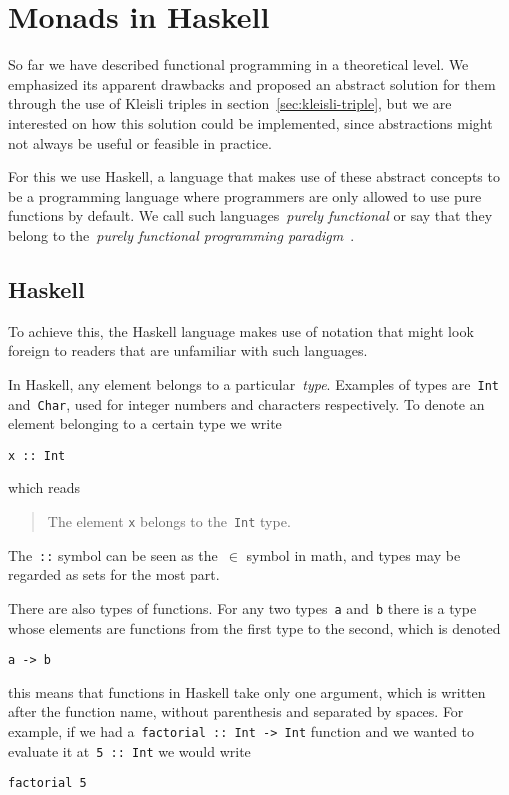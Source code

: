 \documentclass[a4paper]{article}
\theoremstyle{plain}
\theoremstyle{definition}
\begin{document}
\section{Monads in Haskell}
So far we have described functional programming in a theoretical level. We
emphasized its apparent drawbacks and proposed an abstract solution for them
through the use of Kleisli triples in section~\ref{sec:kleisli-triple}, but we
are interested on how this solution could be implemented, since abstractions
might not always be useful or feasible in practice.

For this we use Haskell, a language that makes use of these abstract concepts to
be a programming language where programmers are only allowed to use pure
functions by default. We call such languages~\emph{purely functional} or say
that they belong to the~\emph{purely functional programming
paradigm}~\cite{paradigms-overview}.

\subsection{Haskell}
To achieve this, the Haskell language makes use of notation that might look
foreign to readers that are unfamiliar with such languages.

In Haskell, any element belongs to a particular~\emph{type}. Examples of types
are~\texttt{Int} and~\texttt{Char}, used for integer
numbers and characters respectively. To denote an element belonging to a certain
type we write
\begin{verbatim}
x :: Int
\end{verbatim}
which reads
\begin{quote}
    The element \texttt{x} belongs to the~\texttt{Int}
    type.
\end{quote}
The~\texttt{::} symbol can be seen as the~\(\in\) symbol in math,
and types may be regarded as sets for the most part.

There are also types of functions. For any two types~\texttt{a}
and~\texttt{b} there is a type whose elements are functions from
the first type to the second, which is denoted
\begin{verbatim}
a -> b
\end{verbatim}
this means that functions in Haskell take only one argument, which is written
after the function name, without parenthesis and separated by spaces. For
example, if we had a~\texttt{factorial :: Int -> Int} function and
we wanted to evaluate it at~\texttt{5 :: Int} we would write
\begin{verbatim}
factorial 5
\end{verbatim}
\end{document}

